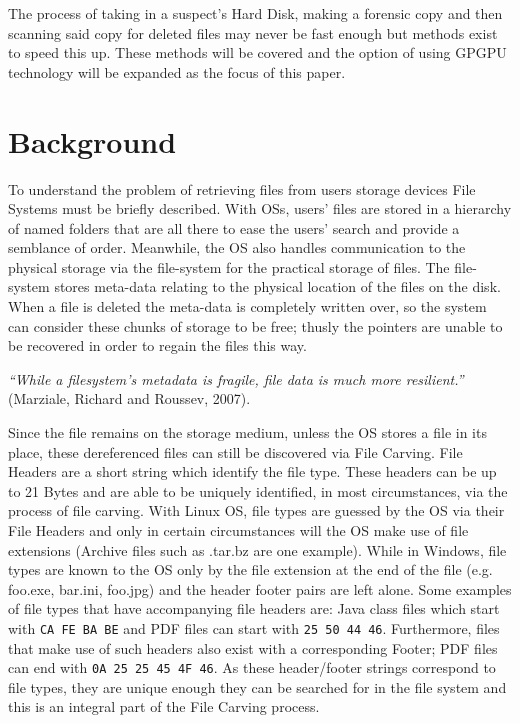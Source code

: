 The process of taking in a suspect’s Hard Disk, making a forensic copy and then scanning said copy for deleted files may never be fast enough but methods exist to speed this up.
These methods will be covered and the option of using GPGPU technology will be expanded as the focus of this paper.
\newpage
\section{Background}
To understand the problem of retrieving files from users storage devices File Systems must be briefly described.
With \acp{OS}, users' files are stored in a hierarchy of named folders that are all there to ease the users' search and provide a semblance of order.
Meanwhile, the \ac{OS} also handles communication to the physical storage via the file-system for the practical storage of files.
The file-system stores meta-data relating to the physical location of the files on the disk.
When a file is deleted the meta-data is completely written over, so the system can consider these chunks of storage to be free; thusly the pointers are unable to be recovered in order to regain the files this way.


{\centering
\textit{``While a filesystem’s metadata is fragile, file data is much more resilient.''} (Marziale, Richard and Roussev, 2007).\par
}

Since the file remains on the storage medium, unless the \ac{OS} stores a file in its place, these dereferenced files can still be discovered via File Carving.
File Headers are a short string which identify the file type.
These headers can be up to 21 Bytes and are able to be uniquely identified, in most circumstances, via the process of file carving.
With Linux \ac{OS}, file types are guessed by the \ac{OS} via their File Headers and only in certain circumstances will the \ac{OS} make use of file extensions (Archive files such as .tar.bz are one example).
While in Windows, file types are known to the \ac{OS} only by the file extension at the end of the file (e.g. foo.exe, bar.ini, foo.jpg) and the header footer pairs are left alone.
Some examples of file types that have accompanying file headers are: Java class files which start with \texttt{CA FE BA BE} and PDF files can start with \texttt{25 50 44 46}.
Furthermore, files that make use of such headers also exist with a corresponding Footer; PDF files can end with \texttt{0A 25 25 45 4F 46}.
As these header/footer strings correspond to file types, they are unique enough they can be searched for in the file system and this is an integral part of the File Carving process.

